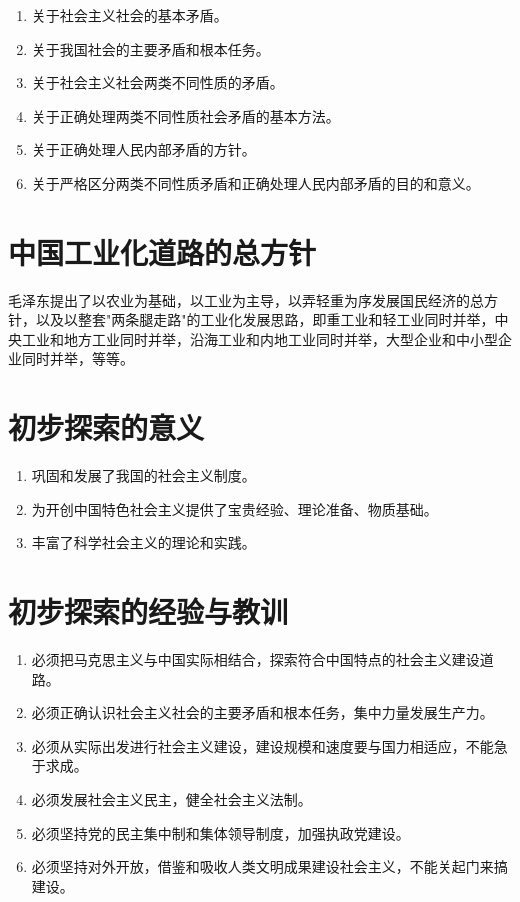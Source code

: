 \documentclass[12pt, a4paper, oneside]{ctexbook}
\begin{document}
\begin{enumerate}[label=（\arabic*）]
\item 关于社会主义社会的基本矛盾。

\item 关于我国社会的主要矛盾和根本任务。

\item 关于社会主义社会两类不同性质的矛盾。

\item 关于正确处理两类不同性质社会矛盾的基本方法。

\item 关于正确处理人民内部矛盾的方针。

\item 关于严格区分两类不同性质矛盾和正确处理人民内部矛盾的目的和意义。
\end{enumerate}

\section{中国工业化道路的总方针}

毛泽东提出了以农业为基础，以工业为主导，以弄轻重为序发展国民经济的总方针，以及以整套"两条腿走路"的工业化发展思路，即重工业和轻工业同时并举，中央工业和地方工业同时并举，沿海工业和内地工业同时并举，大型企业和中小型企业同时并举，等等。

\section{初步探索的意义}

\begin{enumerate}[label=（\arabic*）]
\item 巩固和发展了我国的社会主义制度。

\item 为开创中国特色社会主义提供了宝贵经验、理论准备、物质基础。

\item 丰富了科学社会主义的理论和实践。
\end{enumerate}

\section{初步探索的经验与教训}

\begin{enumerate}[label=（\arabic*）]
\item 必须把马克思主义与中国实际相结合，探索符合中国特点的社会主义建设道路。
\item 必须正确认识社会主义社会的主要矛盾和根本任务，集中力量发展生产力。
\item 必须从实际出发进行社会主义建设，建设规模和速度要与国力相适应，不能急于求成。
\item 必须发展社会主义民主，健全社会主义法制。
\item 必须坚持党的民主集中制和集体领导制度，加强执政党建设。
\item 必须坚持对外开放，借鉴和吸收人类文明成果建设社会主义，不能关起门来搞建设。
\end{enumerate}
\end{document}
